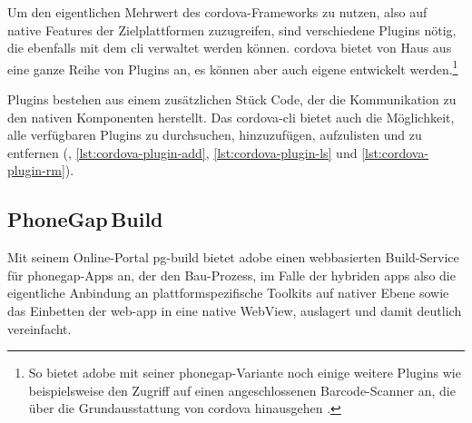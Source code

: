 {



Um den eigentlichen Mehrwert des \gls{cordova}-Frameworks zu nutzen, also auf native Features der Zielplattformen zuzugreifen, sind verschiedene Plugins nötig, die ebenfalls mit dem \gls{cli} verwaltet werden können.
\gls{cordova} bietet von Haus aus eine ganze Reihe von Plugins an, es können aber auch eigene entwickelt werden.\footnote{So bietet \zB \gls{adobe} mit seiner \gls{phonegap}-Variante noch einige weitere Plugins wie beispielsweise den Zugriff auf einen angeschlossenen Barcode-Scanner an, die über die Grundausstattung von \gls{cordova} hinausgehen \cite{Cordova-Docs_CLI}.}

Plugins bestehen aus einem zusätzlichen Stück Code, der die Kommunikation zu den nativen Komponenten herstellt.
Das \gls{cordova}-\gls{cli} bietet auch die Möglichkeit, alle verfügbaren Plugins zu durchsuchen, hinzuzufügen, aufzulisten und zu entfernen (, \ref{lst:cordova-plugin-add}, \ref{lst:cordova-plugin-ls} und \ref{lst:cordova-plugin-rm}).






\subsection{PhoneGap\,Build}

Mit seinem Online-Portal \gls{pg-build} bietet \gls{adobe} einen webbasierten Build-Service für \gls{phonegap}-Apps an, der den Bau-Prozess, im Falle der hybriden \glspl{app} also die eigentliche Anbindung an plattformspezifische Toolkits auf nativer Ebene sowie das Einbetten der \gls{web-app} in eine native WebView, auslagert und damit deutlich vereinfacht.

}
